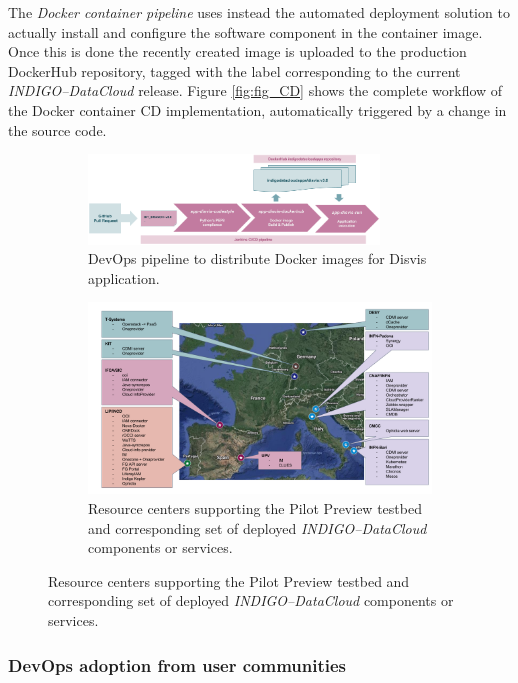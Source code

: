 \documentclass[journal]{IEEEtran}
\begin{document}
The \textit{Docker container pipeline} uses instead the automated deployment solution to
actually install and configure the software component in the container image. Once this is
done the recently created image is uploaded to the production DockerHub repository, tagged
with the label corresponding to the current {\sl INDIGO--DataCloud} release. Figure
\ref{fig:fig_CD} shows the complete workflow of the Docker container CD implementation,
automatically triggered by a change in the source code.

\begin{figure}
	\centering
	\begin{subfigure}
		\centering
\includegraphics[width=0.85\textwidth]{images/disvis-flow.png}
\caption{DevOps pipeline to distribute Docker images for Disvis application.}
\label{fig:fig_disvis}
	\end{subfigure}
	\quad
	\begin{subfigure}
		\centering
\includegraphics[width=\textwidth]{images/pilotpreview.png}
\caption{Resource centers supporting the Pilot Preview testbed and corresponding
set of deployed {\sl INDIGO--DataCloud} components or services.}
\label{fig:fig_pilotpreview}
	\end{subfigure}
\end{figure}


\subsubsection{DevOps adoption from user communities}
\end{document}

